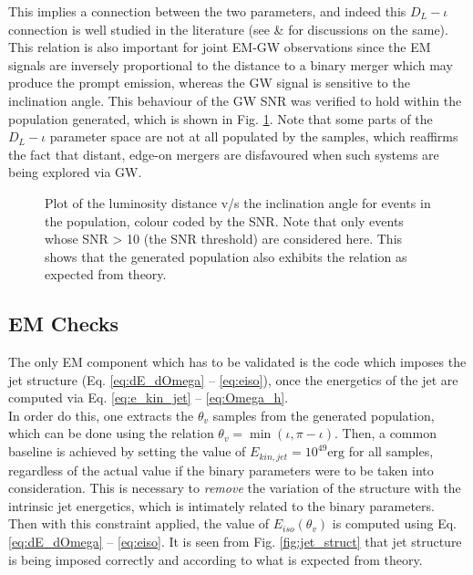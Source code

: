         This implies a connection between the two parameters, and indeed this $D_L-\iota
        $ connection is well studied in the literature (see \cite{schutz_2011} \&
        \cite{seto_2015} for discussions on the same). This relation is also important
        for joint EM-GW observations since the EM signals are inversely proportional to
        the distance to a binary merger which may produce the prompt emission, whereas
        the GW signal is sensitive to the inclination angle. This behaviour of the GW
        SNR was verified to hold within the population generated, which is shown in Fig.
        \ref{fig:dl_iota_correlation}. Note that some parts of the $D_L - \iota$
        parameter space are not at all populated by the samples, which reaffirms the
        fact that distant, edge-on mergers are disfavoured when such systems are being
        explored via GW.

        \begin{figure}[htpb]
            \centering
            \def\svgwidth{0.9\linewidth}
            
            \caption[$D_L-\iota$ correlation in the population]{
                Plot of the luminosity distance v/s the inclination angle for events in
                the population, colour coded by the SNR. Note that only events whose SNR
                > 10 (the SNR threshold) are considered here.  This shows that the
                generated population also exhibits the relation as expected from theory.
            }
            \label{fig:dl_iota_correlation}
        \end{figure}

    \subsection{EM Checks}\label{sub:em_checks}

    The only EM component which has to be validated is the code which imposes the jet
    structure (Eq. \ref{eq:dE_dOmega} -- \ref{eq:eiso}), once the energetics of the jet
    are computed via Eq. \ref{eq:e_kin_jet} -- \ref{eq:Omega_h}.\\
    In order do this, one extracts the $\theta_v$ samples from the generated population,
    which can be done using the relation $\theta_v = \min(\iota, \pi - \iota)$. Then, a
    common baseline is achieved by setting the value of $E_{kin, jet} = 10^{49} \text{
    erg}$ for all samples, regardless of the actual value if the binary parameters were
    to be taken into consideration. This is necessary to \emph{remove} the variation of
    the structure with the intrinsic jet energetics, which is intimately related to the
    binary parameters.\\
    Then with this constraint applied, the value of $E_{iso}(\theta_v)$ is computed
    using Eq.  \ref{eq:dE_dOmega} -- \ref{eq:eiso}. It is seen from Fig.
    \ref{fig:jet_struct} that jet structure is being imposed correctly and according to
    what is expected from theory.

